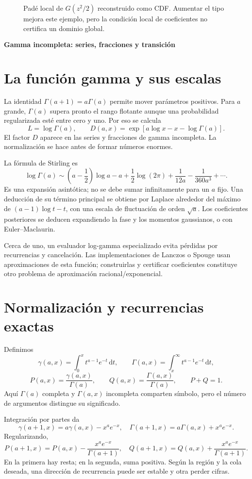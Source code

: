 \documentclass[11pt,a4paper]{article}
\newcommand{\dd}{\,\mathrm d}
\theoremstyle{definition}
\newcommand{\parte}[1]{\par\bigskip\Needspace{8\baselineskip}\begin{center}{\Large\bfseries\color{azul}#1}\end{center}}
\newcounter{problema}
\begin{document}
\begin{figure}[htbp]
\caption{Padé local de $G(z^2/2)$ reconstruido como CDF. Aumentar el tipo mejora este ejemplo, pero la condición local de coeficientes no certifica un dominio global.}\label{fig:phi200-9}
\end{figure}


\parte{Gamma incompleta: series, fracciones y transición}
\section{La función gamma y sus escalas}
La identidad $\Gamma(a+1)=a\Gamma(a)$ permite mover parámetros positivos. Para $a$ grande, $\Gamma(a)$ supera pronto el rango flotante aunque una probabilidad regularizada esté entre cero y uno. Por eso se calcula
\[
L=\log\Gamma(a),\qquad
D(a,x)=\exp[a\log x-x-\log\Gamma(a)].
\]
El factor $D$ aparece en las series y fracciones de gamma incompleta. La normalización se hace antes de formar números enormes.

La fórmula de Stirling es
\[
\log\Gamma(a)\sim
\left(a-\frac12\right)\log a-a+\frac12\log(2\pi)
+\frac1{12a}-\frac1{360a^3}+\cdots.
\]
Es una expansión asintótica; no se debe sumar infinitamente para un $a$ fijo. Una deducción de su término principal se obtiene por Laplace alrededor del máximo de $(a-1)\log t-t$, con una escala de fluctuación de orden $\sqrt a$. Los coeficientes posteriores se deducen expandiendo la fase y los momentos gaussianos, o con Euler--Maclaurin.

Cerca de uno, un evaluador log-gamma especializado evita pérdidas por recurrencias y cancelación. Las implementaciones de Lanczos o Spouge usan aproximaciones de esta función; construirlas y certificar coeficientes constituye otro problema de aproximación racional/exponencial.

\section{Normalización y recurrencias exactas}
Definimos
\[
\gamma(a,x)=\int_0^x t^{a-1}e^{-t}\dd t,\qquad
\Gamma(a,x)=\int_x^\infty t^{a-1}e^{-t}\dd t,
\]
\[
P(a,x)=\frac{\gamma(a,x)}{\Gamma(a)},\qquad
Q(a,x)=\frac{\Gamma(a,x)}{\Gamma(a)},\qquad P+Q=1.
\]
Aquí $\Gamma(a)$ completa y $\Gamma(a,x)$ incompleta comparten símbolo, pero el número de argumentos distingue su significado.

Integración por partes da
\[
\gamma(a+1,x)=a\gamma(a,x)-x^ae^{-x},
\quad
\Gamma(a+1,x)=a\Gamma(a,x)+x^ae^{-x}.
\]
Regularizando,
\[
P(a+1,x)=P(a,x)-\frac{x^ae^{-x}}{\Gamma(a+1)},\quad
Q(a+1,x)=Q(a,x)+\frac{x^ae^{-x}}{\Gamma(a+1)}.
\]
En la primera hay resta; en la segunda, suma positiva. Según la región y la cola deseada, una dirección de recurrencia puede ser estable y otra perder cifras.
\end{document}
